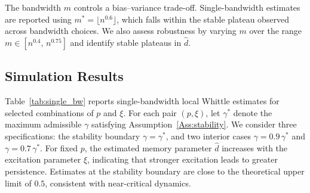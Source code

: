 \documentclass[11pt]{article}
\theoremstyle{definition}
\begin{document}
The bandwidth $m$ controls a bias--variance trade-off.
Single-bandwidth estimates are reported using $m^\ast=\lfloor n^{0.6}\rfloor$, which falls within the stable plateau observed across bandwidth choices.
We also assess robustness by varying $m$ over the range $m\in[n^{0.4},\,n^{0.75}]$ and identify stable plateaus in $\hat d$.


\subsection{Simulation Results}

Table~\ref{tab:single_bw} reports single-bandwidth local Whittle estimates
for selected combinations of $p$ and $\xi$.
For each pair $(p, \xi)$, let $\gamma^*$ denote the maximum admissible $\gamma$
satisfying Assumption~\ref{Ass:stability}.
We consider three specifications: the stability boundary $\gamma = \gamma^*$,
and two interior cases $\gamma = 0.9\,\gamma^*$ and $\gamma = 0.7\,\gamma^*$.
For fixed $p$, the estimated memory parameter $\hat{d}$ increases with the
excitation parameter $\xi$, indicating that stronger excitation leads to greater
persistence.
Estimates at the stability boundary are close to the theoretical upper limit of
$0.5$, consistent with near-critical dynamics.
\end{document}
